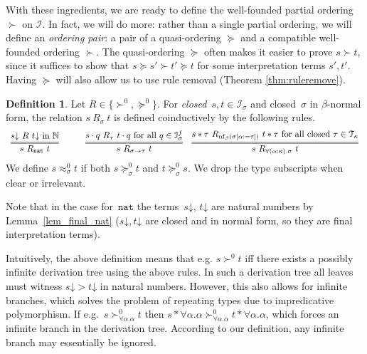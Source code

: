 \documentclass[a4paper,UKenglish,cleveref,autoref,numberwithinsect]{lipics-v2019}
\theoremstyle{definition}
\newtheorem{defn}[theorem]{Definition}
\newcommand{\Iterms}{\mathcal{I}}
\newcommand{\arrtype}{\rightarrow}
\newcommand{\app}[2]{#1 \cdot #2}
\newcommand{\tapp}[2]{#1 * #2}
\newcommand{\subst}[2]{#1:=#2}
\newcommand{\nat}{\mathtt{nat}}
\newcommand{\Tc}{\mathcal{T}}
\newcommand{\nf}{\mathrm{nf}}
\newcommand{\da}{\mathord{\downarrow}}
\begin{document}
With these ingredients, we are ready to define the well-founded
partial ordering $\succ$ on $\Iterms$.  In fact, we will do more: rather
than a single partial ordering, we will define an \emph{ordering pair}: a
pair of a quasi-ordering $\succeq$ and a compatible well-founded ordering
$\succ$. The quasi-ordering $\succeq$ often makes it easier to prove
$s \succ t$, since it suffices to show that $s \succeq s' \succ t'
\succeq t$ for some interpretation terms $s',t'$.  Having $\succeq$ will
also allow us to use rule removal (Theorem \ref{thm:ruleremove}).

\begin{defn}\label{def:succ}
  Let $R \in \{ \succ^0,\succeq^0 \}$. For \emph{closed}~$s,t\in\Iterms_\sigma$
  and closed~$\sigma$ in $\beta$-normal form, the relation
  $s\ R_{\sigma}\ t$ is defined coinductively by the following rules.
  \[
  \begin{array}{ccc}
    \infer={s\ R_\nat\ t}{s\da\ R\ t\da \text{ in }\mathbb{N}} \quad&\quad
    \infer={s\ R_{\sigma\arrtype\tau}\ t}{\app{s}{q}\ R_{\tau}\ \app{t}{q} \text{ for all } q \in \Iterms^f_\sigma} &
    \infer={s\ R_{\forall(\alpha:\kappa).\sigma}\ t}{\tapp{s}{\tau}\ R_{\nf_\beta(\sigma[\subst{\alpha}{\tau}])}\ \tapp{t}{\tau} \text{ for all closed } \tau \in \Tc_{\kappa}}
  \end{array}
  \]
  We define $s \approx_\sigma^0 t$ if both $s \succeq_\sigma^0 t$ and
  $t \succeq_\sigma^0 s$.  We drop the type subscripts when clear or
  irrelevant.
\end{defn}

Note that in the case for~$\nat$ the terms~$s\da$, $t\da$ are natural
numbers by Lemma~\ref{lem_final_nat} ($s\da,t\da$ are closed and in
normal form, so they are final interpretation terms).

Intuitively, the above definition means that e.g. $s \succ^0 t$ iff
there exists a possibly infinite derivation tree using the above
rules. In such a derivation tree all leaves must witness $s\da > t\da$
in natural numbers. However, this also allows for infinite branches,
which solves the problem of repeating types due to impredicative
polymorphism. If e.g.~$s \succ_{\forall \alpha . \alpha}^0 t$ then
$\tapp{s}{\forall\alpha.\alpha} \succ_{\forall \alpha . \alpha}^0
\tapp{t}{\forall\alpha.\alpha}$, which forces an infinite branch in
the derivation tree. According to our definition, any infinite branch
may essentially be ignored.
\end{document}
